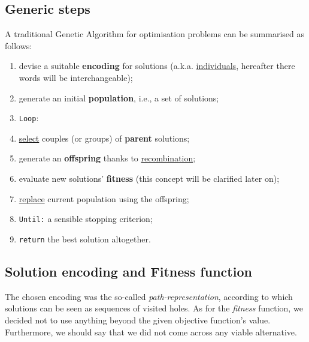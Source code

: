 \documentclass[letterpaper, 10 pt, conference]{ieeeconf}  %
\begin{document}
\subsection{Generic steps} 
A traditional Genetic Algorithm for optimisation problems can be summarised as follows:
\begin{enumerate}
\item devise a suitable \textbf{encoding} for solutions (a.k.a. \underline{individuals}, hereafter there words will be interchangeable);
\item generate an initial \textbf{population}, i.e., a set of solutions;
\item \texttt{Loop}:
\item \hspace*{ 0.2 mm} \underline{select} couples (or groups) of \textbf{parent} solutions;
\item \hspace*{ 0.2 mm} generate an \textbf{offspring} thanks to \underline{recombination};
\item \hspace*{ 0.2 mm} evaluate new solutions' \textbf{fitness} (this concept will be \hspace*{ 0.2 mm} clarified later on);
\item \hspace*{ 0.2 mm} \underline{replace} current population using the offspring;
\item \texttt{Until:} a sensible stopping criterion;
\item \texttt{return} the best solution altogether.
\end{enumerate}

\subsection{Solution encoding and Fitness function}
The chosen encoding was the so-called \textit{path-representation}, according to which solutions can be seen as sequences of visited holes. \newline
As for the \textit{fitness} function, we decided not to use anything beyond the given objective function's value. Furthermore, we should say that we did not come across any viable alternative.
\end{document}

